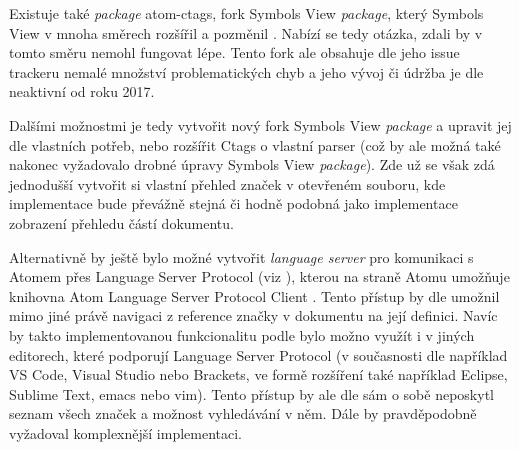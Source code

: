 Existuje také \textit{package} atom-ctags, fork Symbols View \textit{package}, který Symbols View v mnoha směrech
rozšířil a pozměnil \cite{atom-package-atom-ctags-github}. Nabízí se tedy otázka, zdali by v tomto směru nemohl fungovat
lépe. Tento fork ale obsahuje dle jeho issue trackeru \cite{atom-package-atom-ctags-github} nemalé množství
problematických chyb a jeho vývoj či údržba je dle \cite{atom-package-atom-ctags-github} neaktivní od roku 2017.

Dalšími možnostmi je tedy vytvořit nový fork Symbols View \textit{package} a upravit jej dle vlastních potřeb, nebo
rozšířit Ctags o vlastní parser (což by ale možná také nakonec vyžadovalo drobné úpravy Symbols View \textit{package}).
Zde už se však zdá jednodušší vytvořit si vlastní přehled značek v otevřeném souboru, kde implementace bude převážně
stejná či hodně podobná jako implementace zobrazení přehledu částí dokumentu.

Alternativně by ještě bylo možné vytvořit \textit{language server} pro komunikaci s Atomem přes Language Server
Protocol (viz \cite{lsp-docs}), kterou na straně Atomu umožňuje knihovna Atom Language Server Protocol Client
\cite{atom-lsp-client-github}. Tento přístup by dle \cite{atom-lsp-client-github} umožnil mimo jiné právě navigaci z
reference značky v dokumentu na její definici. Navíc by takto implementovanou funkcionalitu podle \cite{lsp-docs} bylo
možno využít i v jiných editorech, které podporují Language Server Protocol (v současnosti dle \cite{lsp-docs} například
VS Code, Visual Studio nebo Brackets, ve formě rozšíření také například Eclipse, Sublime Text, emacs nebo vim). Tento
přístup by ale dle \cite{atom-lsp-client-github} sám o sobě neposkytl seznam všech značek a možnost vyhledávání v něm.
Dále by pravděpodobně vyžadoval komplexnější implementaci.
